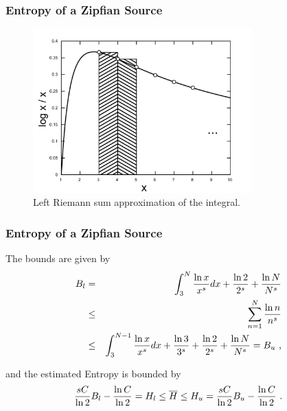 \documentclass{beamer}
\begin{document}
\frame
{
  \frametitle{Entropy of a Zipfian Source}
  \begin{figure}[h]
  \centering
  \includegraphics[width=0.75\textwidth]{images/logk_k_integral.pdf}
  \caption{Left Riemann sum approximation of the integral.}
  \label{fig:logk_k_integral}
  \end{figure}
}


\frame
{
  \frametitle{Entropy of a Zipfian Source}
  The bounds are given by
  \begin{eqnarray}
  \label{eq:riemmansumeboundsfinal}
  B_l &=& \int_{3}^{N} \frac{\ln x}{x^s} dx + \frac{\ln 2}{2^s} + \frac{\ln N}{N^s} \nonumber \\ 
      &\leq& \sum_{n=1}^{N} \frac{\ln n}{n^s} \nonumber \\
      &\leq& \int_{3}^{N-1} \frac{\ln x}{x^s} dx + \frac{\ln 3}{3^s} + \frac{\ln 2}{2^s} + \frac{\ln N}{N^s} = B_u \textmd{ ,}
  \end{eqnarray}

  and the estimated Entropy is bounded by
  \begin{equation}
  \frac{sC}{\ln 2} B_l - \frac{\ln C}{\ln 2} =  H_l \leq  \overline{H} \leq H_u = \frac{sC}{\ln 2} B_u - \frac{\ln C}{\ln 2} \textmd{ .}
  \end{equation}
}
\end{document}
